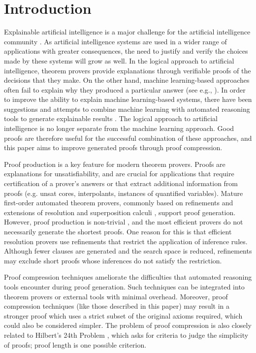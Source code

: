 \section{Introduction} 

Explainable artificial intelligence is a major challenge for the artificial intelligence community \cite{bonacina2017automated}.
As artificial intelligence systems are used in a wider range of applications with greater consequences, the need to justify and verify the choices made by these systems will grow as well.
In the logical approach to artificial intelligence, theorem provers provide explanations through verifiable proofs of the decisions that they make.
On the other hand, machine learning-based approaches often fail to explain why they produced a particular answer (see e.g., \cite{miller2019explanation}). 
In order to improve the ability to explain machine learning-based systems, there have been suggestions and attempts to combine machine learning with automated reasoning tools to generate explainable results \cite{bonacina2017automated,siebert2019corg}. 
The logical approach to artificial intelligence is no longer separate from the machine learning approach.
Good proofs are therefore useful for the successful combination of these approaches, and this paper aims to improve generated proofs through proof compression.

Proof production is a key feature for modern theorem provers. 
Proofs are explanations for unsatisfiability, and are crucial for applications that require certification of a prover's answers or that extract additional information from proofs (e.g. unsat cores, interpolants, instances of quantified variables).
Mature first-order automated theorem provers, commonly based on refinements and extensions of resolution and superposition calculi \cite{Vampire,EProver,Spass,spassT,Beagle,cruanes2015extending,prover9-mace4}, support proof generation. 
However, proof production is non-trivial \cite{SchulzAPPA}, and the most efficient provers do not necessarily generate the shortest proofs.
One reason for this is that efficient resolution provers use refinements that restrict the application of inference rules.
Although fewer clauses are generated and the search space is reduced, refinements may exclude short proofs whose inferences do not satisfy the restriction.

Proof compression techniques ameliorate the difficulties that automated reasoning tools encounter during proof generation. Such techniques can be integrated into theorem provers or external tools with minimal overhead. Moreover, proof compression techniques (like those described in this paper) may result in a stronger proof which uses a strict subset of the original axioms required, which could also be considered simpler. The problem of proof compression is also closely related to Hilbert's 24th Problem \cite{Hilbert24Problem}, which asks for criteria to judge the simplicity of proofs; proof length is one possible criterion. 


